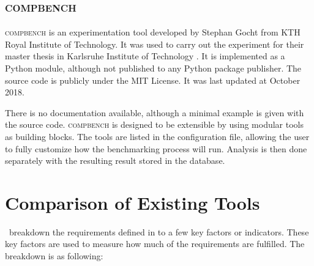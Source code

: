 \subsection{\textsc{compbench}}

\textsc{compbench} \citep{gochtPythonFrameworkRunning2018} is an experimentation tool developed by Stephan Gocht from KTH Royal Institute of Technology.
It was used to carry out the experiment for their master thesis in Karlsruhe Institute of Technology \citep{gochtIncrementalSATSolving}.
It is implemented as a Python module, although not published to any Python package publisher.
The source code is publicly under the MIT License.
It was last updated at October 2018.

There is no documentation available, although a minimal example is given with the source code.
\textsc{compbench} is designed to be extensible by using modular tools as building blocks.
The tools are listed in the configuration file, allowing the user to fully customize how the benchmarking process will run.
Analysis is then done separately with the resulting result stored in the database.


\section{Comparison of Existing Tools}

\First~breakdown the requirements defined in  to a few key factors or indicators.
These key factors are used to measure how much of the requirements are fulfilled.
The breakdown is as following:

